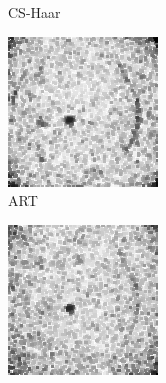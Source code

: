 \documentclass[journal]{IEEEtran}
\begin{document}
\begin{figure}[!h]
\begin{subfigure}[b]{0.24\linewidth}
        \caption{CS-Haar}
     \end{subfigure}
    \begin{subfigure}[b]{0.24\linewidth}
        \includegraphics[width=\textwidth]{../images/potato/2D/weightsIm_art30.png}
        \caption{ART}
     \end{subfigure}
    \begin{subfigure}[b]{0.24\linewidth}
        \includegraphics[width=\textwidth]{../images/potato/2D/weightsIm_sart30.png}

\end{subfigure}
\end{figure}
\end{document}
